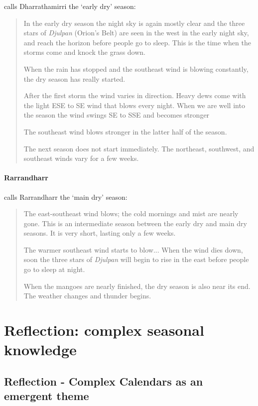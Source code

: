 \citet{davis1989} calls Dharrathamirri the `early dry' season:
\blockquote{
    In the early dry season the night sky is again mostly clear and the three stars of
    \textit{Djulpan} (Orion's Belt) are seen in the west in the early night sky,
    and reach the horizon before people go to sleep.
    This is the time when the storms come and knock the grass down.
    
    When the rain has stopped and the southeast wind is blowing constantly, the dry season has really started.
    
    After the first storm the wind varies in direction.
    Heavy dews come with the light ESE to SE wind that blows every night.
    When we are well into the season the wind swings SE to SSE and becomes stronger
    
    The southeast wind blows stronger in the latter half of the season.
    
    The next season does not start immediately.
    The northeast, southwest, and southeast winds vary for a few weeks.
}


\paragraph{Rarrandharr}

\citet{davis1989} calls Rarrandharr the `main dry' season:
\blockquote{
    The east-southeast wind blows; the cold mornings and mist are nearly gone.
    This is an intermediate season between the early dry and main dry seasons.
    It is very short, lasting only a few weeks.
    
    The warmer southeast wind starts to blow...
    When the wind dies down, soon the three stars of \textit{Djulpan}
    will begin to rise in the east before people go to sleep at night.
    
    When the mangoes are nearly finished, the dry season is also near its end.
    The weather changes and thunder begins.
}



\section{Reflection: complex seasonal knowledge}


\subsection{Reflection - Complex Calendars as an emergent theme}

